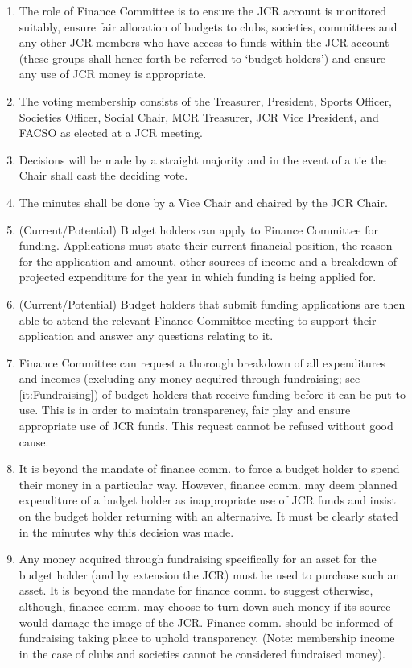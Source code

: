 \begin{enumerate}
    \item The role of Finance Committee is to ensure the JCR account is monitored suitably, ensure fair allocation of budgets to clubs, societies, committees and any other JCR members who have access to funds within the JCR account (these groups shall hence forth be referred to ‘budget holders’) and ensure any use of JCR money is appropriate.
    \item The voting membership consists of the Treasurer, President, Sports Officer, Societies Officer, Social Chair, MCR Treasurer, JCR Vice President, and FACSO as elected at a JCR meeting.
    \item Decisions will be made by a straight majority and in the event of a tie the Chair shall cast the deciding vote.
    \item The minutes shall be done by a Vice Chair and chaired by the JCR Chair.
    \item (Current/Potential) Budget holders can apply to Finance Committee for funding. Applications must state their current financial position, the reason for the application and amount, other sources of income and a breakdown of projected expenditure for the year in which funding is being applied for.
    \item (Current/Potential) Budget holders that submit funding applications are then able to attend the relevant Finance Committee meeting to support their application and answer any questions relating to it.
    \item Finance Committee can request a thorough breakdown of all expenditures and incomes (excluding any money acquired through fundraising; see \ref{it:Fundraising}) of budget holders that receive funding before it can be put to use. This is in order to maintain transparency, fair play and ensure appropriate use of JCR funds. This request cannot be refused without good cause.
    \item It is beyond the mandate of finance comm. to force a budget holder to spend their money in a particular way. However, finance comm. may deem planned expenditure of a budget holder as inappropriate use of JCR funds and insist on the budget holder returning with an alternative. It must be clearly stated in the minutes why this decision was made.
    \item Any money acquired through fundraising specifically for an asset for the budget holder (and by extension the JCR) must be used to purchase such an asset. It is beyond the mandate for finance comm. to suggest otherwise, although, finance comm. may choose to turn down such money if its source would damage the image of the JCR. Finance comm. should be informed of fundraising taking place to uphold transparency. (Note: membership income in the case of clubs and societies cannot be considered fundraised money).

\end{enumerate}
